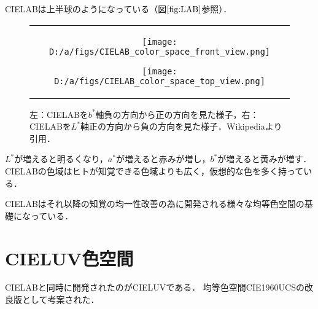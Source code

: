 \documentclass[uplatex,paper=a4,fontsize=4.0truemm,jafontsize=4.0truemm,head_space=30.0truemm,foot_space=30.0truemm,baselineskip=8.0truemm,line_length=40zw,gutter=25.0truemm,oneside,openany,fleqn,hanging_panctuation,open_bracket_pos=nibu_tentsuki,dvipdfmx,jis2004,book,titlepage]{jlreq}
\theoremstyle{mystyle}
\newcommand{\captiondot}[1]{\caption{#1．}}
\newcommand{\mathdisplaystyle}[1]{\(\displaystyle{#1}\)}
\newcommand{\Reference}[1]{\mathdisplaystyle{\ref{#1}}}
\begin{document}
			CIELABは上半球のようになっている（図\Reference{fig:LAB}参照）．
			\begin{figure}[tbp]
				\centering
				\begin{tabular}{c}
					\begin{minipage}{0.5\linewidth}
						\centering
						\texttt{[image: D:/a/figs/CIELAB\_color\_space\_front\_view.png]}
					\end{minipage}
					\begin{minipage}{0.5\linewidth}
						\centering
						\texttt{[image: D:/a/figs/CIELAB\_color\_space\_top\_view.png]}
					\end{minipage}
				\end{tabular}
				\captiondot{左：CIELABを\mathdisplaystyle{b^\ast}軸負の方向から正の方向を見た様子，右：CIELABを\mathdisplaystyle{L^\ast}軸正の方向から負の方向を見た様子．Wikipediaより引用}\label{fig:LAB}
			\end{figure}
			\mathdisplaystyle{L^\ast}が増えると明るくなり，\mathdisplaystyle{a^\ast}が増えると赤みが増し，\mathdisplaystyle{b^\ast}が増えると黄みが増す．
			CIELABの色域はヒトが知覚できる色域よりも広く，仮想的な色を多く持っている．

			CIELABはそれ以降の知覚の均一性改善の為に開発される様々な均等色空間の基礎になっている．
		\section{CIELUV色空間}
			CIELABと同時に開発されたのがCIELUVである．
			均等色空間CIE1960UCSの改良版として考案された．
\end{document}
